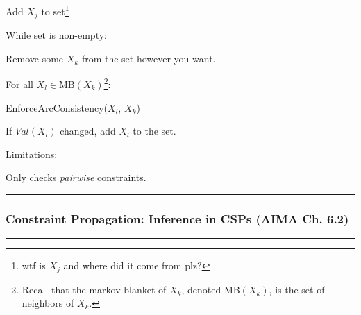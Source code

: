 \documentclass[11pt]{article}
\newcommand\subsub[1]{\Needspace{15\baselineskip}\hrule\subsubsection{#1}\hrule}
\begin{document}
\begin{algorithm}[AC-3 \tstamp{1:12:39}]
	\begin{compactenum}
		\item Add $X_j$ to set\footnote{wtf is $X_j$ and where did it come from plz?}
		\item While set is non-empty:
		\begin{compactenum}
			\item Remove some $X_k$ from the set however you want.
			\item For all $X_l \in \text{MB}(X_k)$\footnote{Recall that the markov blanket of $X_k$, denoted $\text{MB}(X_k)$, is the set of neighbors of $X_k$.}:
			\begin{compactenum}
				\item EnforceArcConsistency($X_l$, $X_k$)
				\item If $Val(X_l)$ changed, add $X_l$ to the set.
			\end{compactenum}
		\end{compactenum}
	\end{compactenum}
	\tcblower

	Limitations:
	\begin{compactitem}
		\item Only checks \textit{pairwise} constraints. 
	\end{compactitem}
\end{algorithm}





\subsub{Constraint Propagation: Inference in CSPs (AIMA Ch. 6.2)}
\end{document}
